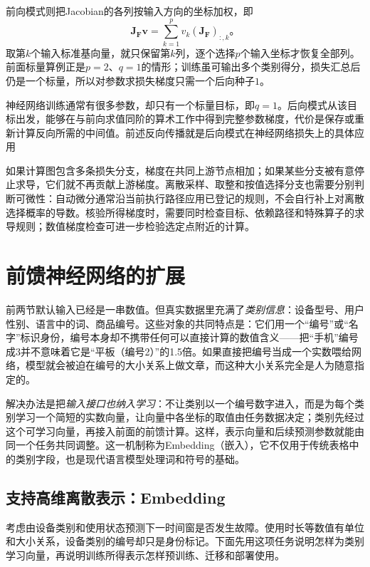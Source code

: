 前向模式则把Jacobian的各列按输入方向的坐标加权，即
\[
  \bm J_{\bm F}\bm v=\sum_{k=1}^{p}v_k(\bm J_{\bm F})_{:,k}\text{。}
\]
取第$k$个输入标准基向量，就只保留第$k$列，逐个选择$p$个输入坐标才恢复全部列。前面标量算例正是$p=2$、$q=1$的情形；训练虽可输出多个类别得分，损失汇总后仍是一个标量，所以对参数求损失梯度只需一个后向种子$1$。

神经网络训练通常有很多参数，却只有一个标量目标，即$q=1$。后向模式从该目标出发，能够在与前向求值同阶的算术工作中得到完整参数梯度，代价是保存或重新计算反向所需的中间值。前述反向传播就是后向模式在神经网络损失上的具体应用

如果计算图包含多条损失分支，梯度在共同上游节点相加；如果某些分支被有意停止求导，它们就不再贡献上游梯度。离散采样、取整和按值选择分支也需要分别判断可微性：自动微分通常沿当前执行路径应用已登记的规则，不会自行补上对离散选择概率的导数。核验所得梯度时，需要同时检查目标、依赖路径和特殊算子的求导规则；数值梯度检查可进一步检验选定点附近的计算。

\section{前馈神经网络的扩展}
\label{sec:ffn-extensions}

前两节默认输入已经是一串数值。但真实数据里充满了\emph{类别信息}：设备型号、用户性别、语言中的词、商品编号。这些对象的共同特点是：它们用一个“编号”或“名字”标识身份，编号本身却不携带任何可以直接计算的数值含义——把“手机”编号成3并不意味着它是“平板（编号2）”的1.5倍。如果直接把编号当成一个实数喂给网络，模型就会被迫在编号的大小关系上做文章，而这种大小关系完全是人为随意指定的。

解决办法是把\emph{输入接口也纳入学习}：不让类别以一个编号数字进入，而是为每个类别学习一个简短的实数向量，让向量中各坐标的取值由任务数据决定；类别先经过这个可学习向量，再接入前面的前馈计算。这样，表示向量和后续预测参数就能由同一个任务共同调整。这一机制称为Embedding（嵌入），它不仅用于传统表格中的类别字段，也是现代语言模型处理词和符号的基础。

\subsection{支持高维离散表示：Embedding}
\label{sec:ffn-embedding}

考虑由设备类别和使用状态预测下一时间窗是否发生故障。使用时长等数值有单位和大小关系，设备类别的编号却只是身份标记。下面先用这项任务说明怎样为类别学习向量，再说明训练所得表示怎样预训练、迁移和部署使用。


